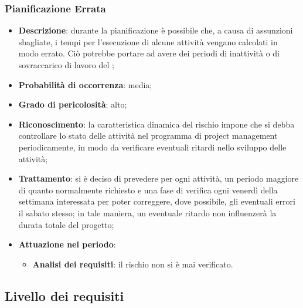 		\subsubsection{Pianificazione Errata}
		\begin{itemize}
			\item \textbf{Descrizione}: durante la pianificazione è possibile che, a causa di assunzioni sbagliate, i tempi per l'esecuzione di alcune attività vengano calcolati in modo errato. Ciò potrebbe portare ad avere dei periodi di inattività o di sovraccarico di lavoro del ;
			\item \textbf{Probabilità di occorrenza}: media;
			\item \textbf{Grado di pericolosità}: alto;
			\item \textbf{Riconoscimento}: la caratteristica dinamica del rischio impone che si debba controllare lo stato delle attività nel programma di project management periodicamente, in modo da verificare eventuali ritardi nello sviluppo delle attività; 
			\item \textbf{Trattamento}: si è deciso di prevedere per ogni attività, un periodo maggiore di quanto normalmente richiesto e una fase di verifica ogni venerdì della settimana interessata per poter correggere, dove possibile, gli eventuali errori il sabato stesso; in tale maniera, un eventuale ritardo non influenzerà la durata totale del progetto; 
			\item \textbf{Attuazione nel periodo}:
			\begin{itemize}
				\item \textbf{Analisi dei requisiti}:  il rischio non si è mai verificato.
			\end{itemize}
		\end{itemize}
	\subsection{Livello dei requisiti}
